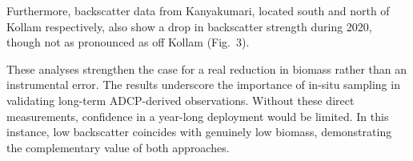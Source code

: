 \documentclass[12pt,a4paper]{article}
\begin{document}
Furthermore, backscatter data from Kanyakumari, located south and north of Kollam respectively, also show a drop in backscatter strength during 2020, though not as pronounced as off Kollam (Fig.~3).

These analyses strengthen the case for a real reduction in biomass rather than an instrumental error. The results underscore the importance of in-situ sampling in validating long-term ADCP-derived observations. Without these direct measurements, confidence in a year-long deployment would be limited. In this instance, low backscatter coincides with genuinely low biomass, demonstrating the complementary value of both approaches.



%
%
\end{document}
